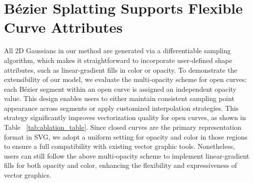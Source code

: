 \section{Bézier Splatting Supports Flexible Curve Attributes}
All 2D Gaussians in our method are generated via a differentiable sampling algorithm, which makes it straightforward to incorporate user-defined shape attributes, such as linear-gradient fills in color or opacity. To demonstrate the extensibility of our model, we evaluate the multi-opacity scheme for open curves: each Bézier segment within an open curve is assigned an independent opacity value. This design enables users to either maintain consistent sampling point appearance across segments or apply customized interpolation strategies. This strategy significantly improves vectorization quality for open curves, as shown in Table ~\ref{tab:ablation_table}. Since closed curves are the primary representation format in SVG, we adopt a uniform setting for opacity and color in those regions to ensure a full compatibility with existing vector graphic tools. Nonetheless, users can still follow the above multi-opacity scheme to implement linear-gradient fills for both opacity and color, enhancing the flexibility and expressiveness of vector graphics.

\begin{table}[!h]
\centering
\caption{An ablation study on the number of opacity parameters per curve, evaluated on 512 open curves with DIV2K dataset \cite{Timofte_2017_CVPR_Workshops}.}
\vspace{-.5em}
\label{tab:ablation_table}
\end{table}











